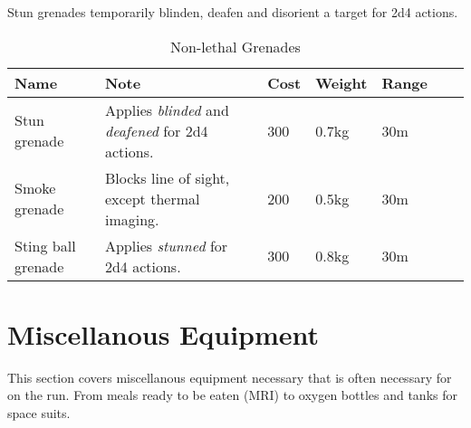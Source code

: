 Stun grenades temporarily blinden, deafen and disorient a target for 2d4
actions.

\begin{table}
  \caption{Non-lethal Grenades}
  \label{tab:NonlethalGrenades}
  \begin{center}
    \begin{tabular}{| l | l | l | l | l | l | l |}

      \hline
      \textbf{Name} & \textbf{Note} & \textbf{Cost} & \textbf{Weight} & \textbf{Range} \\ \hline

      Stun grenade  & Applies \emph{blinded} and \emph{deafened} for 2d4 actions. & 300 & 0.7kg & 30m \\ \hline
      Smoke grenade & Blocks line of sight, except thermal imaging. & 200 & 0.5kg & 30m \\ \hline
      Sting ball grenade & Applies \emph{stunned} for 2d4 actions. & 300 & 0.8kg & 30m \\ \hline

    \end{tabular}
  \end{center}
\end{table}

\section{Miscellanous Equipment}
\label{sec:9-Miscellanous Equipment}

This section covers miscellanous equipment necessary that is often necessary for
on the run. From meals ready to be eaten (MRI) to oxygen bottles and tanks for
space suits.



